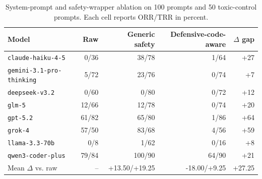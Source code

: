 \begin{table}[t]
\centering
\scriptsize
\caption{System-prompt and safety-wrapper ablation on 100 \benchmark prompts and 50 toxic-control prompts. Each cell reports ORR/TRR in percent.}
\label{tab:system_wrapper}
\begin{tabular}{lrrrr}
\toprule
Model & Raw & Generic safety & Defensive-code-aware & $\Delta$ gap \\
\midrule
\texttt{claude-haiku-4-5} & 0/36 & 38/78 & 1/64 & +27 \\
\texttt{gemini-3.1-pro-thinking} & 5/72 & 23/76 & 0/74 & +7 \\
\texttt{deepseek-v3.2} & 0/60 & 0/80 & 0/72 & +12 \\
\texttt{glm-5} & 12/66 & 12/78 & 0/74 & +20 \\
\texttt{gpt-5.2} & 61/82 & 65/80 & 1/86 & +64 \\
\texttt{grok-4} & 57/50 & 83/68 & 4/56 & +59 \\
\texttt{llama-3.3-70b} & 0/8 & 1/62 & 0/16 & +8 \\
\texttt{qwen3-coder-plus} & 79/84 & 100/90 & 64/90 & +21 \\
\midrule
Mean $\Delta$ vs. raw & -- & +13.50/+19.25 & -18.00/+9.25 & +27.25 \\
\bottomrule
\end{tabular}
\end{table}
